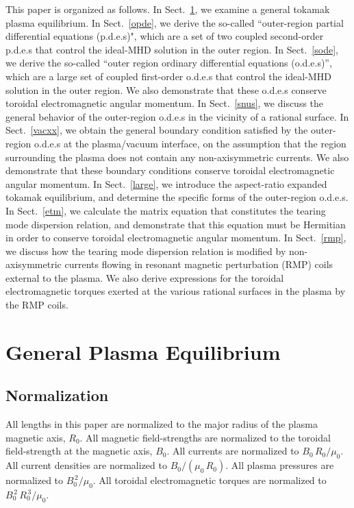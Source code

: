 \documentclass[12pt,prb,aps]{revtex4-1}
\begin{document}
This paper is organized as follows. In Sect.~\ref{geq}, we examine a general tokamak plasma equilibrium. In Sect.~\ref{opde}, we
derive the so-called ``outer-region  partial differential equations (p.d.e.s)", which are a set of two coupled second-order p.d.e.s that control   the ideal-MHD solution in the outer region. In
Sect.~\ref{sode}, we derive the so-called ``outer region ordinary differential equations  (o.d.e.s)'', which are a large set of coupled first-order 
o.d.e.s that control the ideal-MHD solution in the outer region. We also demonstrate that these o.d.e.s conserve toroidal electromagnetic
angular momentum. In Sect.~\ref{snus}, we discuss the general behavior of the outer-region o.d.e.s in the vicinity of a rational surface. 
In Sect.~\ref{vacxx}, we obtain the general boundary condition satisfied by the outer-region o.d.e.s at the plasma/vacuum interface, on the assumption that
the region surrounding the plasma does not contain any non-axisymmetric currents. We also demonstrate that these boundary conditions conserve
toroidal electromagnetic angular momentum. In Sect.~\ref{large}, we introduce the aspect-ratio expanded tokamak equilibrium, and determine the
specific forms of the outer-region o.d.e.s. In Sect.~\ref{etm}, we calculate the matrix equation that constitutes the tearing mode dispersion relation, and
demonstrate that this equation must be Hermitian in order to conserve toroidal electromagnetic angular momentum. In Sect.~\ref{rmp}, 
we discuss how the tearing mode dispersion relation is modified by non-axisymmetric currents flowing in
 resonant magnetic perturbation (RMP) coils external to the plasma. We also derive expressions for the toroidal electromagnetic
torques exerted at the various rational surfaces in the plasma by the RMP coils.

\section{General Plasma Equilibrium}\label{geq}
\subsection{Normalization}\label{coords}
All lengths in this paper are normalized to  the major radius of the plasma magnetic axis, $R_0$. All magnetic field-strengths
are normalized to the  toroidal field-strength at the magnetic axis, $B_0$. All currents are normalized to $B_0\,R_0/\mu_0$. All current densities are normalized to $B_0/(\mu_0\,R_0)$.  All plasma pressures are normalized to $B_0^{\,2}/\mu_0$.
All toroidal electromagnetic torques are normalized to $B_0^{\,2}\,R_0^{\,3}/\mu_0$. 
\end{document}
